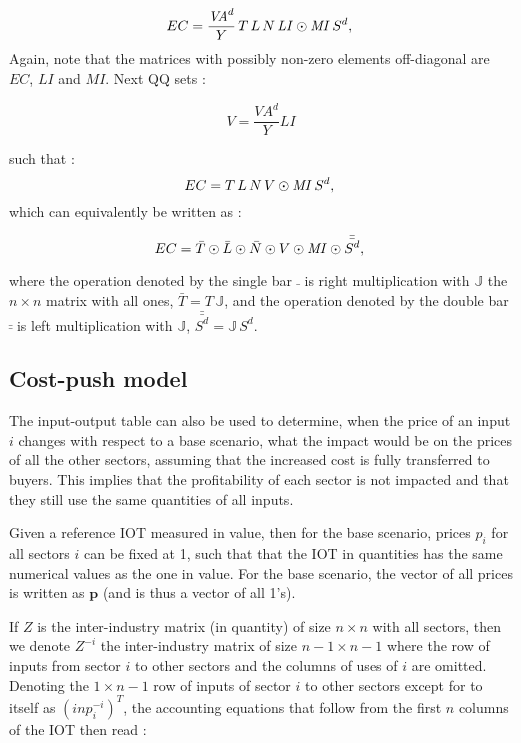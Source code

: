 \documentclass[12pt,english]{article}
\newcommand{\mli}[1]{\mathit{#1}}
\begin{document}
\begin{equation}
EC	= \frac{\mli{VA}^d}{Y} \, T \, L \, N \, \mli{LI} \odot \mli{MI} \, S^d,   \label{decompEC1} \\ 
\end{equation}
Again, note that the matrices with possibly non-zero elements off-diagonal are $EC$, $LI$ and $MI$. Next QQ sets :

$$ V = \frac{\mli{VA}^d}{Y} \mli{LI}$$ 

such that :
\begin{equation}
EC	= T \, L \, N \, V \odot \mli{MI} \, S^d,   \label{decompEC1} \\ 
\end{equation}
which can equivalently be written as :

\begin{equation}
EC	= \bar{T} \odot \bar{L} \odot \bar{N} \odot V \odot \mli{MI} \odot \bar{\bar{S^d}},   \label{decompEC2} \\ 
\end{equation}

where the operation denoted by the single bar $\bar{\ }$ is right multiplication with $\mathbb{J}$ the $n\times n$ matrix with all ones, $\bar{T} = T \, \mathbb{J}$, and the operation denoted by the double bar $\bar{\bar{\ }}$ is left multiplication with $\mathbb{J}$, $\bar{\bar{S^d}} = \mathbb{J} \, S^d$. 

\subsection{Cost-push model}

The input-output table can also be used to determine, when the price of an input $i$ changes with respect to a base scenario, what the impact would be on the prices of all the other sectors, assuming that the increased cost is fully transferred to buyers. This implies that the profitability of each sector is not impacted and that they still use the same quantities of all inputs. 

Given a reference IOT measured in value, then for the base scenario, prices $p_i$ for all sectors $i$ can be fixed at 1, such that that the IOT in quantities has the same numerical values as the one in value. For the base scenario, the vector of all prices is written as $\boldsymbol{p}$ (and is thus a vector of all 1's).

If $Z$ is the inter-industry matrix (in quantity) of size $n\times n$ with all sectors, then we denote $Z^{-i}$ the inter-industry matrix of size $n-1 \times n-1$ where the row of inputs from sector $i$ to other sectors and the columns of uses of $i$ are omitted. Denoting the $1 \times n-1$ row of inputs of sector $i$ to other sectors except for to itself as $(inp^{-i}_i)^T$, the accounting equations that follow from the first $n$ columns of the IOT then read :
\end{document}
